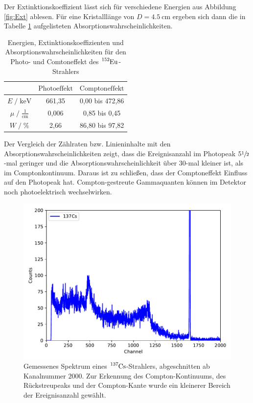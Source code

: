 Der Extinktionskoeffizient lässt sich für verschiedene Energien aus Abbildung \ref{fig:Ext} ablesen.
Für eine Kristalllänge von $D = \SI{4.5}{\centi\meter}$ ergeben sich dann die in Tabelle \ref{tab:mess3}
aufgelisteten Absorptionswahrscheinlichkeiten.

\begin{table}
  \centering
  \caption{Energien, Extinktionskoeffizienten und Absorptionswahrscheinlichkeiten für den Photo- und Comtoneffekt des $\ce{^{152}Eu}$-Strahlers}
  \label{tab:mess3}
  \begin{tabular}{c c c }
  \toprule
  $ $ & $\text{Photoeffekt}$ & $\text{Comptoneffekt}$ \\
  \midrule
  $E \;/\; \si{\kilo\eV}$                 & 661,35 & 0,00 bis 472,86  \\
  $\mu \;/\; \frac{1}{\si{\centi\meter}}$ & 0,006  & 0,85 bis 0,45 \\
  $W \;/\; \si{\percent}$                 & 2,66   & 86,80 bis 97,82 \\
  \bottomrule
  \end{tabular}
\end{table}

Der Vergleich der Zählraten bzw. Linieninhalte mit den Absorptionswahrscheinlichkeiten zeigt, dass die Ereignisanzahl im Photopeak 
$5 \sfrac{1}{2}$-mal geringer und die Absorptionswahrscheinlichkeit über $30$-mal kleiner ist, als im Comptonkontinuum.
Daraus ist zu schließen, dass der Comptoneffekt Einfluss auf den Photopeak hat. Compton-gestreute Gammaquanten können im 
Detektor noch photoelektrisch wechselwirken.

\begin{figure}[H]
  \centering
  \includegraphics[scale=0.7]{content/plot21.pdf}
  \caption{Gemessenes Spektrum eines $\ce{^{137}Cs}$-Strahlers, abgeschnitten ab Kanalnummer $\num{2000}$. Zur Erkennung
    des Compton-Kontinuums, des Rückstreupeaks und der Compton-Kante wurde ein kleinerer Bereich der Ereignisanzahl gewählt.}
  \label{fig:plot21}
\end{figure}

